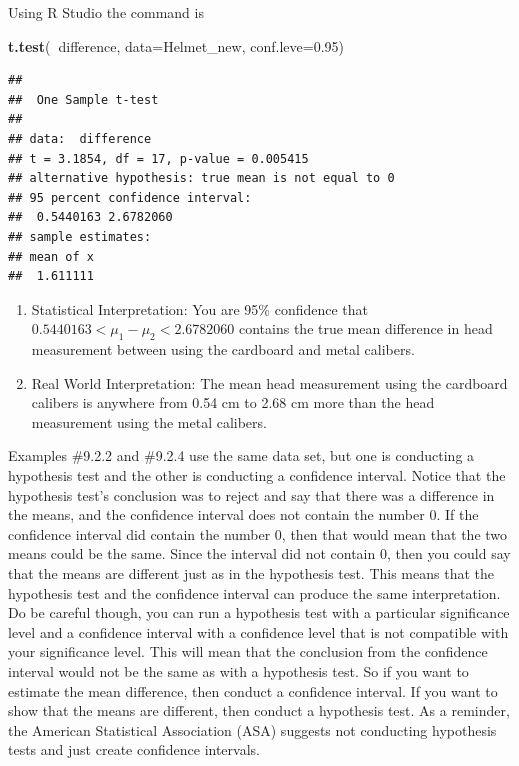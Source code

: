 \documentclass[
]{book}
\newenvironment{Shaded}{\begin{snugshade}}{\end{snugshade}}
\newcommand{\DataTypeTok}[1]{\textcolor[rgb]{0.13,0.29,0.53}{#1}}
\newcommand{\FloatTok}[1]{\textcolor[rgb]{0.00,0.00,0.81}{#1}}
\newcommand{\KeywordTok}[1]{\textcolor[rgb]{0.13,0.29,0.53}{\textbf{#1}}}
\newcommand{\NormalTok}[1]{#1}
\newcommand{\OperatorTok}[1]{\textcolor[rgb]{0.81,0.36,0.00}{\textbf{#1}}}
\begin{document}
Using R Studio the command is

\begin{Shaded}
\begin{Highlighting}[]
\KeywordTok{t.test}\NormalTok{(}\OperatorTok{~}\NormalTok{difference, }\DataTypeTok{data=}\NormalTok{Helmet_new, }\DataTypeTok{conf.leve=}\FloatTok{0.95}\NormalTok{)}
\end{Highlighting}
\end{Shaded}

\begin{verbatim}
## 
## 	One Sample t-test
## 
## data:  difference
## t = 3.1854, df = 17, p-value = 0.005415
## alternative hypothesis: true mean is not equal to 0
## 95 percent confidence interval:
##  0.5440163 2.6782060
## sample estimates:
## mean of x 
##  1.611111
\end{verbatim}

\begin{enumerate}
\def\labelenumi{\arabic{enumi}.}
\setcounter{enumi}{3}
\item
  Statistical Interpretation: You are 95\% confidence that \(0.5440163<\mu_1-\mu_2<2.6782060\) contains the true mean difference in head measurement between using the cardboard and metal calibers.
\item
  Real World Interpretation: The mean head measurement using the cardboard calibers is anywhere from 0.54 cm to 2.68 cm more than the head measurement using the metal calibers.
\end{enumerate}

Examples \#9.2.2 and \#9.2.4 use the same data set, but one is conducting a hypothesis test and the other is conducting a confidence interval. Notice that the hypothesis test's conclusion was to reject and say that there was a difference in the means, and the confidence interval does not contain the number 0. If the confidence interval did contain the number 0, then that would mean that the two means could be the same. Since the interval did not contain 0, then you could say that the means are different just as in the hypothesis test. This means that the hypothesis test and the confidence interval can produce the same interpretation. Do be careful though, you can run a hypothesis test with a particular significance level and a confidence interval with a confidence level that is not compatible with your significance level. This will mean that the conclusion from the confidence interval would not be the same as with a hypothesis test. So if you want to estimate the mean difference, then conduct a confidence interval. If you want to show that the means are different, then conduct a hypothesis test. As a reminder, the American Statistical Association (ASA) suggests not conducting hypothesis tests and just create confidence intervals.
\end{document}
